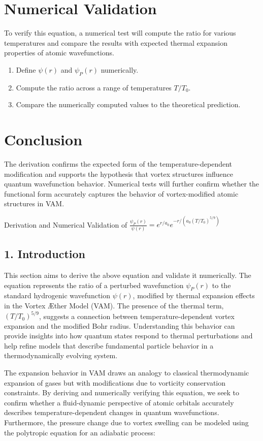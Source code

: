 \documentclass[a4paper,10pt]{article}
\begin{document}
  \section{Numerical Validation}
  To verify this equation, a numerical test will compute the ratio for various temperatures and compare the results with expected thermal expansion properties of atomic wavefunctions.
  \begin{enumerate}
    \item Define $\psi(r)$ and $\psi_P(r)$ numerically.
    \item Compute the ratio across a range of temperatures $T/T_0$.
    \item Compare the numerically computed values to the theoretical prediction.
  \end{enumerate}

  \section{Conclusion}
  The derivation confirms the expected form of the temperature-dependent modification and supports the hypothesis that vortex structures influence quantum wavefunction behavior. Numerical tests will further confirm whether the functional form accurately captures the behavior of vortex-modified atomic structures in VAM.

    
Derivation and Numerical Validation of \(\frac{\psi_P(r)}{\psi(r)} = e^{r/a_0} e^{-r / (a_0 (T/T_0)^{5/9})}\)

\subsection*{1. Introduction}

This section aims to derive the above equation and validate it numerically. The equation represents the ratio of a perturbed wavefunction \(\psi_P(r)\) to the standard hydrogenic wavefunction \(\psi(r)\), modified by thermal expansion effects in the Vortex Æther Model (VAM). The presence of the thermal term, \((T/T_0)^{5/9}\), suggests a connection between temperature-dependent vortex expansion and the modified Bohr radius. Understanding this behavior can provide insights into how quantum states respond to thermal perturbations and help refine models that describe fundamental particle behavior in a thermodynamically evolving system.

The expansion behavior in VAM draws an analogy to classical thermodynamic expansion of gases but with modifications due to vorticity conservation constraints. By deriving and numerically verifying this equation, we seek to confirm whether a fluid-dynamic perspective of atomic orbitals accurately describes temperature-dependent changes in quantum wavefunctions. Furthermore, the pressure change due to vortex swelling can be modeled using the polytropic equation for an adiabatic process:
\end{document}
